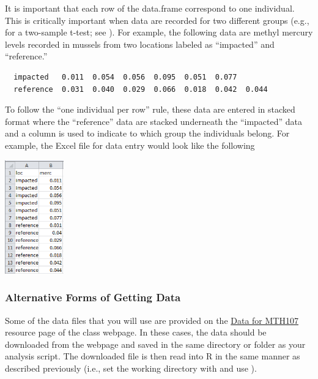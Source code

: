 \documentclass[10pt,openany]{book}\usepackage[]{graphicx}\usepackage[]{color}
\begin{document}

It is important that each row of the data.frame correspond to one individual.  This is critically important when data are recorded for two different groups (e.g., for a two-sample t-test; see ).  For example, the following data are methyl mercury levels recorded in mussels from two locations labeled as ``impacted'' and ``reference.''
\begin{Verbatim}
  impacted   0.011  0.054  0.056  0.095  0.051  0.077
  reference  0.031  0.040  0.029  0.066  0.018  0.042  0.044
\end{Verbatim}
To follow the ``one individual per row'' rule, these data are entered in stacked format where the ``reference'' data are stacked underneath the ``impacted'' data and a column is used to indicate to which group the individuals belong.  For example, the Excel file for data entry would look like the following

\begin{center}
  \includegraphics[width=1in]{Figs/StackedData.jpg}
\end{center}


\subsubsection*{Alternative Forms of Getting Data} \label{sect:RAltData}
Some of the data files that you will use are provided on the \href{http://derekogle.com/NCMTH107/resources/data_107}{Data for MTH107} resource page of the class webpage.  In these cases, the data should be downloaded from the webpage and saved in the same directory or folder as your analysis script.  The downloaded file is then read into R in the same manner as described previously (i.e., set the working directory with  and use ).
\end{document}
